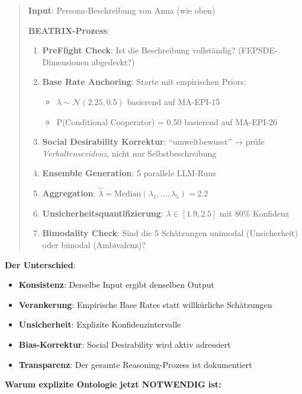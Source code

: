 \begin{quote}
\textbf{Input}: Persona-Beschreibung von Anna (wie oben)

\textbf{BEATRIX-Prozess}:
\begin{enumerate}
    \item \textbf{PreFlight Check}: Ist die Beschreibung vollständig? (FEPSDE-Dimensionen abgedeckt?)
    \item \textbf{Base Rate Anchoring}: Starte mit empirischen Priors:
    \begin{itemize}
        \item $\lambda \sim \mathcal{N}(2.25, 0.5)$ basierend auf MA-EPI-15
        \item P(Conditional Cooperator) = 0.50 basierend auf MA-EPI-26
    \end{itemize}
    \item \textbf{Social Desirability Korrektur}: ``umweltbewusst'' → prüfe \textit{Verhaltensevidenz}, nicht nur Selbstbeschreibung
    \item \textbf{Ensemble Generation}: 5 parallele LLM-Runs
    \item \textbf{Aggregation}: $\hat{\lambda} = \text{Median}(\lambda_1, ..., \lambda_5) = 2.2$
    \item \textbf{Unsicherheitsquantifizierung}: $\lambda \in [1.9, 2.5]$ mit 80\% Konfidenz
    \item \textbf{Bimodality Check}: Sind die 5 Schätzungen unimodal (Unsicherheit) oder bimodal (Ambivalenz)?
\end{enumerate}
\end{quote}

\textbf{Der Unterschied}:
\begin{itemize}
    \item \textbf{Konsistenz}: Derselbe Input ergibt denselben Output
    \item \textbf{Verankerung}: Empirische Base Rates statt willkürliche Schätzungen
    \item \textbf{Unsicherheit}: Explizite Konfidenzintervalle
    \item \textbf{Bias-Korrektur}: Social Desirability wird aktiv adressiert
    \item \textbf{Transparenz}: Der gesamte Reasoning-Prozess ist dokumentiert
\end{itemize}

\textbf{Warum explizite Ontologie jetzt NOTWENDIG ist:}

